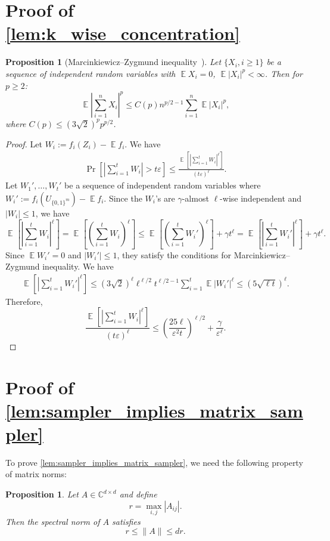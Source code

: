 \documentclass[10pt,a4paper]{article}
\newtheorem{proposition}[theorem]{Proposition}
\DeclareMathOperator*{\E}{\mathbb{E}}
\newcommand{\eps}{\varepsilon}
\newcommand{\1}{\mathbbm{1}}
\newcommand{\abs}[1]{\left|#1\right| }
\newcommand{\tuple}[1]{\left(#1\right)}
\newcommand{\zo}{\{0, 1\}}
\newcommand{\Prb}[2][]{\Pr_{#1}\left[#2\right]}
\newcommand{\Ex}[2][]{\E_{#1}\left[#2\right]}
\begin{document}
\section{Proof of \cref{lem:k_wise_concentration}}
\label{sec:k-wise-proof}
\begin{proposition}[Marcinkiewicz–Zygmund inequality~\cite{ren2001best}]
\label{prop:MZ_inequality}
Let $\{X_i, i \geq 1\}$ be a sequence of independent random variables with $\E X_i = 0$, $\E |X_i|^p < \infty$. Then for $p \ge 2$:
\[
    \E \left|\sum_{i=1}^{n} X_i\right|^p \leq C(p)n^{p/2-1}\sum_{i=1}^{n}\E |X_i|^p,
\]
where $C(p) \leq (3\sqrt{2})^p p^{p/2}$.
\end{proposition}

\kWiseConcentration*
\begin{proof}
    Let $W_i := f_i(Z_i) - \E f_i$. 
    We have
    \begin{align*}
    \Prb{\abs{\sum_{i=1}^t W_i} > t\eps} \le \frac{\Ex{\abs{\sum_{i=1}^t W_i}^\ell}}{(t\eps)^\ell}. 
\end{align*}
 Let $W_1', \dots, W_t'$ be a sequence of independent random variables where $W_i' := f_i(U_{\zo^m}) - \E f_i$.  Since the $W_i$'s are $\gamma$-almost $\ell$-wise independent and $|W_i| \le 1$, we have \[
    \Ex{\abs{\sum_{i=1}^t W_i}^\ell} = \Ex{\tuple{\sum_{i=1}^t W_i}^\ell} \le \Ex{\tuple{\sum_{i=1}^t W_i'}^\ell} + \gamma t^\ell = \Ex{\abs{\sum_{i=1}^t W_i'}^\ell} + \gamma t^\ell.
\]
Since $\E W_i' = 0$ and $|W_i'| \le 1$,
they satisfy the conditions for Marcinkiewicz–Zygmund inequality. We have \begin{align*}
    \Ex{\abs{\sum_{i=1}^t W_i'}^\ell} \leq (3\sqrt{2})^\ell \ell^{\ell/2}t^{\ell/2-1}\sum_{i=1}^{t}\E |W_i'|^\ell \le (5\sqrt{\ell t})^\ell.
\end{align*}
Therefore, \[
\frac{\Ex{\abs{\sum_{i=1}^t W_i}^\ell}}{(t\eps)^\ell} \le \left( \frac{25{\ell}}{\eps^2 {t}} \right)^{\ell/2} + \frac{\gamma}{\eps^\ell}.
\]
\end{proof}

\section{Proof of \cref{lem:sampler_implies_matrix_sampler}}

\label{sec:WXproof}

To prove \cref{lem:sampler_implies_matrix_sampler}, we need the following property of matrix norms:
\begin{proposition}
\label{prop:norm_bound_complex}
Let \( A \in \mathbb{C}^{d \times d} \) and define
\[
r = \max_{i, j} |A_{ij}|.
\]
Then the spectral norm of \( A \) satisfies
\[
r \leq \|A\| \leq d r.
\]
\end{proposition}
\end{document}
